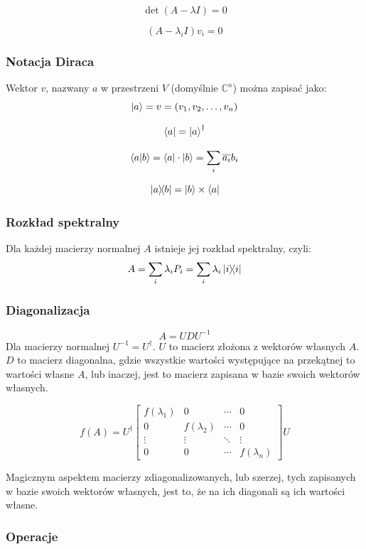 \documentclass{../notatki}
\begin{document}
$$
\det(A - \lambda I) = 0
$$

$$
(A - \lambda_i I)v_i = 0
$$

\subsubsection{Notacja Diraca}

Wektor $v$, nazwany $a$ w przestrzeni $V$ (domyślnie $\mathbb{C}^n$)
można zapisać jako:
$$
\ket{a} = v = (v_1, v_2, \ldots, v_n)
$$

$$
\bra{a} = \ket{a}^\dagger
$$

$$
\braket{a}{b} = \bra{a} \cdot \ket{b} = \sum_{i} \overline{a_i} b_i
$$

$$
\ketbra{a}{b} = \ket{b} \times \bra{a}
$$

\subsubsection{Rozkład spektralny}

Dla każdej macierzy normalnej $A$ istnieje jej rozkład spektralny, czyli:
$$
A = \sum_{i} \lambda_i P_i = \sum_{i} \lambda_i \ketbra{i}{i}
$$

\subsubsection{Diagonalizacja}

$$
A = UDU^{-1}
$$
Dla macierzy normalnej $U^{-1} = U^\dag$. $U$ to macierz złożona z
wektorów własnych $A$. $D$ to macierz diagonalna, gdzie wszystkie wartości
występujące na przekątnej to wartości własne $A$, lub inaczej, jest to macierz
zapisana w bazie swoich wektorów własnych.

$$
f(A) = U^\dag
\begin{bmatrix}
  f(\lambda_1) & 0 & \cdots & 0 \\
  0 & f(\lambda_2) & \cdots & 0 \\
  \vdots & \vdots & \ddots & \vdots \\
  0 & 0 & \cdots & f(\lambda_n)
\end{bmatrix} U
$$

Magicznym aspektem macierzy zdiagonalizowanych, lub szerzej, tych zapisanych
w bazie swoich wektorów własnych, jest to, że na ich diagonali są ich wartości
własne.

\subsubsection{Operacje}
\end{document}

